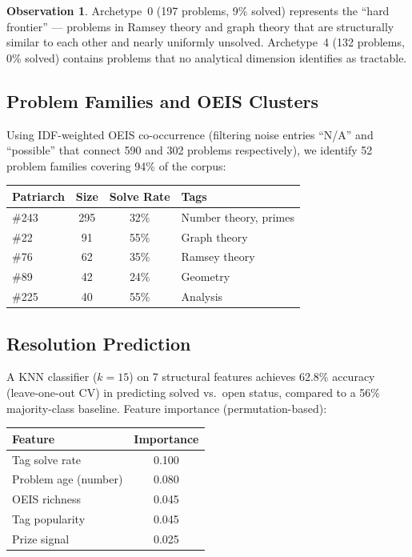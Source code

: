 \documentclass[11pt,a4paper]{article}
\theoremstyle{definition}
\newtheorem{observation}[theorem]{Observation}
\theoremstyle{remark}
\begin{document}
\begin{observation}
Archetype~0 (197 problems, 9\% solved) represents the ``hard frontier''
--- problems in Ramsey theory and graph theory that are structurally similar
to each other and nearly uniformly unsolved. Archetype~4 (132 problems,
0\% solved) contains problems that no analytical dimension identifies as
tractable.
\end{observation}

\subsection{Problem Families and OEIS Clusters}

Using IDF-weighted OEIS co-occurrence (filtering noise entries ``N/A'' and
``possible'' that connect 590 and 302 problems respectively), we identify
52 problem families covering 94\% of the corpus:

\begin{center}
\begin{tabular}{lccp{4cm}}
\toprule
Patriarch & Size & Solve Rate & Tags \\
\midrule
\#243 & 295 & 32\% & Number theory, primes \\
\#22 & 91 & 55\% & Graph theory \\
\#76 & 62 & 35\% & Ramsey theory \\
\#89 & 42 & 24\% & Geometry \\
\#225 & 40 & 55\% & Analysis \\
\bottomrule
\end{tabular}
\end{center}

\subsection{Resolution Prediction}

A KNN classifier ($k=15$) on 7 structural features achieves 62.8\% accuracy
(leave-one-out CV) in predicting solved vs.\ open status, compared to a
56\% majority-class baseline. Feature importance (permutation-based):

\begin{center}
\begin{tabular}{lc}
\toprule
Feature & Importance \\
\midrule
Tag solve rate & 0.100 \\
Problem age (number) & 0.080 \\
OEIS richness & 0.045 \\
Tag popularity & 0.045 \\
Prize signal & 0.025 \\
\bottomrule
\end{tabular}
\end{center}
\end{document}
